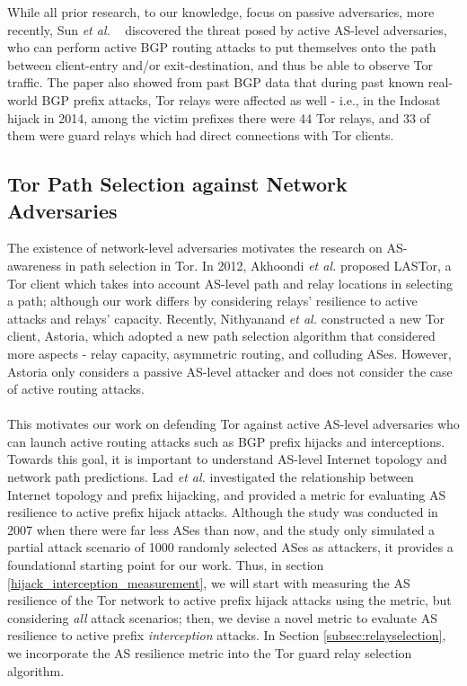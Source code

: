 While all prior research, to our knowledge, focus on passive adversaries, more recently, Sun \emph{et al.} ~\cite{sun2015raptor} discovered the threat posed by active AS-level adversaries, who can perform active BGP routing attacks to put themselves onto the path between client-entry and/or exit-destination, and thus be able to observe Tor traffic. The paper also showed from past BGP data that during past known real-world BGP prefix attacks, Tor relays were affected as well - i.e., in the Indosat hijack in 2014, among the victim prefixes there were 44 Tor relays, and 33 of them were guard relays which had direct connections with Tor clients. 

\subsection{Tor Path Selection against Network Adversaries}
The existence of network-level adversaries motivates the research on AS-awareness in path selection in Tor. In 2012, Akhoondi \emph{et al.} \cite{akhoondi2012lastor} proposed LASTor, a Tor client which takes into account AS-level path and relay locations in selecting a path; although our work differs by considering relays' resilience to active attacks and relays' capacity. Recently, Nithyanand \emph{et al.} \cite{starov2015measuring} constructed a new Tor client, Astoria, which adopted a new path selection algorithm that considered more aspects - relay capacity, asymmetric routing, and colluding ASes. However, Astoria only considers a passive AS-level attacker and does not consider the case of active routing attacks.\\
\\

This motivates our work on defending Tor against active AS-level adversaries who can launch active routing attacks such as BGP prefix hijacks and interceptions. Towards this goal, it is important to understand AS-level Internet topology and network path predictions. Lad \emph{et al.} \cite{lad2007understanding} investigated the relationship between Internet topology and prefix hijacking, and provided a metric for evaluating AS resilience to active prefix hijack attacks. Although the study was conducted in 2007 when there were far less ASes than now, and the study only simulated a partial attack scenario of 1000 randomly selected ASes as attackers, it provides a foundational starting point for our work. Thus, in section \ref{hijack_interception_measurement}, we will start with measuring the AS resilience of the Tor network to active prefix hijack attacks using the metric, but considering \emph{all} attack scenarios; then, we devise a novel metric to evaluate AS resilience to active prefix \emph{interception} attacks. In Section \ref{subsec:relayselection}, we incorporate the AS resilience metric into the Tor guard relay selection algorithm. 


